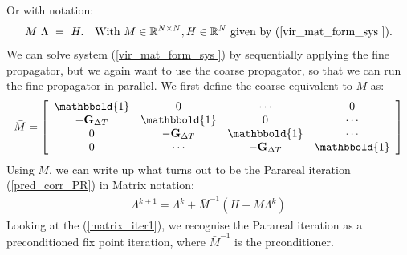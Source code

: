 Or with notation:
\begin{align}
M \ \Lambda \ = \ H.\quad \textrm{With $M\in\mathbb{R}^{N\times N},H\in\mathbb{R}^N$ given by (\ref{vir_mat_form_sys }).} \label{vir_mat_sys}
\end{align}
We can solve system (\ref{vir_mat_form_sys }) by sequentially applying the fine propagator, but we again want to use the coarse propagator, so that we can run the fine propagator in parallel. We first define the coarse equivalent to $M$ as:
\begin{align}
\bar{M} = \left[ \begin{array}{cccc}
   \mathbbold{1} & 0 & \cdots & 0 \\  
   -\bold{G}_{\Delta T} & \mathbbold{1} & 0 & \cdots \\ 
   0 &-\bold{G}_{\Delta T} & \mathbbold{1}  & \cdots \\
   0 &\cdots &-\bold{G}_{\Delta T} & \mathbbold{1}   \\
   \end{array}  \right]
\end{align}
Using $\bar{M}$, we can write up what turns out to be the Parareal iteration (\ref{pred_corr_PR}) in Matrix notation:
\begin{align}
\Lambda^{k+1} = \Lambda^k + \bar{M}^{-1}(H-M\Lambda^k) \label{matrix_iter1}
\end{align}
Looking at the (\ref{matrix_iter1}), we recognise the Parareal iteration as a preconditioned fix point iteration, where $\bar{M}^{-1}$ is the prconditioner.
